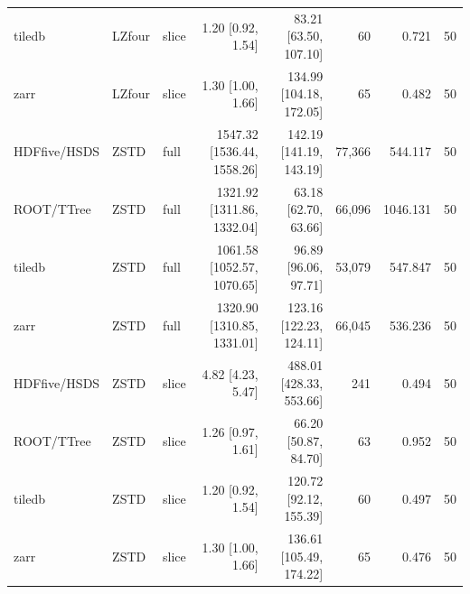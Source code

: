 \documentclass[nomenclature, english, bibtex]{kththesis}
\numberwithin{listing}{chapter}
\begin{document}
\begin{table}[H]
{{\begin{tabular}{lllrrrrr}
tiledb& \gls{LZfour}  & slice & 1.20    [0.92, 1.54]        & 83.21  [63.50, 107.10]  & 60       & 0.721    & 50 \\
zarr  & \gls{LZfour}  & slice & 1.30    [1.00, 1.66]        & 134.99 [104.18, 172.05] & 65       & 0.482    & 50 \\
\gls{HDFfive}/\gls{HSDS}  & \gls{ZSTD} & full  & 1547.32 [1536.44, 1558.26] & 142.19 [141.19, 143.19] & 77{,}366 & 544.117  & 50 \\
\gls{ROOT}/\gls{TTree}  & \gls{ZSTD} & full  & 1321.92 [1311.86, 1332.04] & 63.18  [62.70, 63.66]   & 66{,}096 & 1046.131 & 50 \\
tiledb& \gls{ZSTD} & full  & 1061.58 [1052.57, 1070.65] & 96.89  [96.06, 97.71]   & 53{,}079 & 547.847  & 50 \\
zarr  & \gls{ZSTD} & full  & 1320.90 [1310.85, 1331.01] & 123.16 [122.23, 124.11] & 66{,}045 & 536.236  & 50 \\
\gls{HDFfive}/\gls{HSDS}  & \gls{ZSTD} & slice & 4.82    [4.23, 5.47]        & 488.01 [428.33, 553.66] & 241      & 0.494    & 50 \\
\gls{ROOT}/\gls{TTree}  & \gls{ZSTD} & slice & 1.26    [0.97, 1.61]        & 66.20  [50.87, 84.70]   & 63       & 0.952    & 50 \\
tiledb& \gls{ZSTD} & slice & 1.20    [0.92, 1.54]        & 120.72 [92.12, 155.39]  & 60       & 0.497    & 50 \\
zarr  & \gls{ZSTD} & slice & 1.30    [1.00, 1.66]        & 136.61 [105.49, 174.22] & 65       & 0.476    & 50 \\
        \bottomrule
      \end{tabular}
    }
  }
\end{table}
\end{document}
